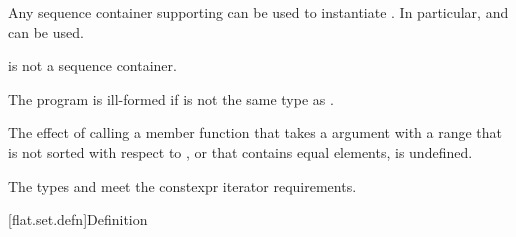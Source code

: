 \pnum
Any sequence container
supporting 
can be used to instantiate .
In particular,  and 
can be used.
\begin{note}
 is not a sequence container.
\end{note}

\pnum
The program is ill-formed if  is not the same type
as .

\pnum
The effect of calling a member function
that takes a  argument
with a range that is not sorted with respect to , or
that contains equal elements, is undefined.

\pnum
The types  and  meet
the constexpr iterator requirements.

[flat.set.defn]{Definition}

